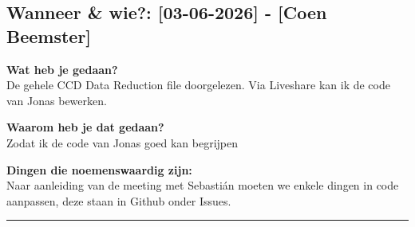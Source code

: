 
\subsection*{Wanneer \& wie?: [03-06-2026] - [Coen Beemster]}

\textbf{Wat heb je gedaan?}\\
De gehele CCD Data Reduction file doorgelezen. Via Liveshare kan ik de code van Jonas bewerken.
\vspace{0.3cm} 

\noindent \textbf{Waarom heb je dat gedaan?}\\
Zodat ik de code van Jonas goed kan begrijpen

\noindent \textbf{Dingen die noemenswaardig zijn:}\\
Naar aanleiding van de meeting met Sebastián moeten we enkele dingen in code aanpassen, deze staan in Github onder Issues.


\vspace{0.5cm}
\hrule 
\vspace{0.5cm}
